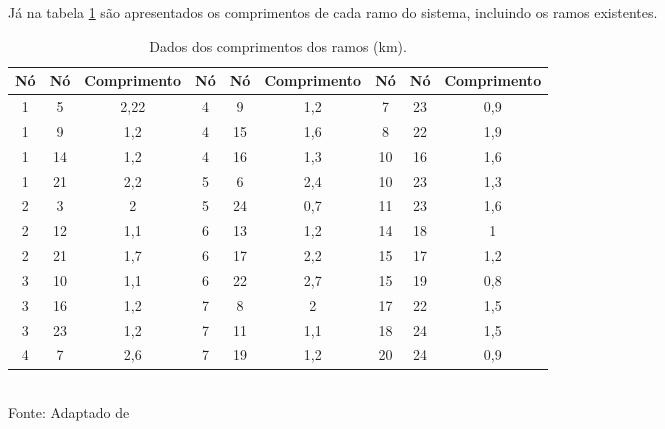 Já na tabela \ref{tab:param_ramos} são apresentados os comprimentos de cada ramo do sistema, incluindo os ramos existentes.
\begin{table}[ht]
\centering
\caption{Dados dos comprimentos dos ramos (km).}
\label{tab:param_ramos}
\begin{tabular}{@{}ccccccccc@{}}
\toprule
Nó & Nó & Comprimento & Nó & Nó & Comprimento & Nó & Nó & Comprimento \\ \midrule
1  & 5  & 2,22        & 4  & 9  & 1,2         & 7  & 23 & 0,9         \\
1  & 9  & 1,2         & 4  & 15 & 1,6         & 8  & 22 & 1,9         \\
1  & 14 & 1,2         & 4  & 16 & 1,3         & 10 & 16 & 1,6         \\
1  & 21 & 2,2         & 5  & 6  & 2,4         & 10 & 23 & 1,3         \\
2  & 3  & 2           & 5  & 24 & 0,7         & 11 & 23 & 1,6         \\
2  & 12 & 1,1         & 6  & 13 & 1,2         & 14 & 18 & 1           \\
2  & 21 & 1,7         & 6  & 17 & 2,2         & 15 & 17 & 1,2         \\
3  & 10 & 1,1         & 6  & 22 & 2,7         & 15 & 19 & 0,8         \\
3  & 16 & 1,2         & 7  & 8  & 2           & 17 & 22 & 1,5         \\
3  & 23 & 1,2         & 7  & 11 & 1,1         & 18 & 24 & 1,5         \\
4  & 7  & 2,6         & 7  & 19 & 1,2         & 20 & 24 & 0,9         \\ \bottomrule
\end{tabular}
\\Fonte: Adaptado de 
\end{table}

